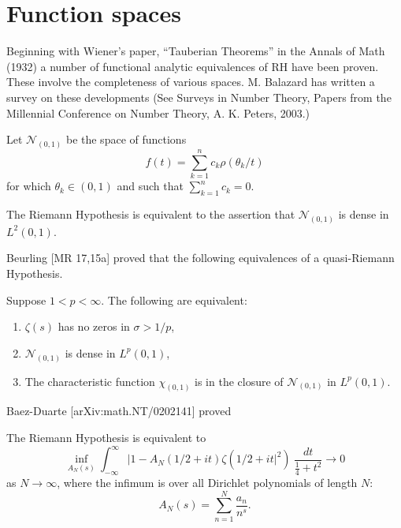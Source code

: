 \documentclass[12pt,letterpaper, reqno]{aimpl}
\begin{document}
\section{Function spaces }

Beginning with Wiener's paper, ``Tauberian Theorems'' in the Annals of
Math (1932) a number of functional analytic equivalences of RH have been
proven. These involve the completeness of various spaces.  M. Balazard has
written a survey on these developments (See Surveys
in Number Theory, Papers from the Millennial Conference on Number Theory,
A. K. Peters, 2003.)

\begin{problemblock}
Let $\mathcal N_{(0,1)} $ be the space of functions
$$
f(t)=\sum_{k=1}^n c_k \rho(\theta_k/t)
$$
for which $\theta_k\in (0,1)$ and such that $\sum_{k=1}^n c_k=0$.

\begin{rhequivalence}[7.1]The Riemann Hypothesis is
equivalent to the assertion that $\mathcal N_{(0,1)} $
is dense in  $L^2(0,1)$.
\end{rhequivalence}

\end{problemblock}

\begin{problemblock} Beurling [MR 17,15a] proved that the following
equivalences of a quasi-Riemann Hypothesis.
\begin{rhequivalence}[7.2] Suppose $1<p<\infty$.  The following
are equivalent:
\begin{enumerate}
\item{} $\zeta(s)$ has no zeros in $\sigma>1/p$,
\item{}   $\mathcal N_{(0,1)} $ is dense in  $L^p(0,1)$,
\item{} The characteristic function $\chi_{(0,1)}$ is in the closure
of $\mathcal N_{(0,1)} $   in  $L^p(0,1)$.
\end{enumerate}
\end{rhequivalence}
\end{problemblock}

\begin{problemblock}
Baez-Duarte [arXiv:math.NT/0202141]
proved
\begin{rhequivalence}[7.3] The Riemann Hypothesis is equivalent to
$$
\inf_{A_N(s)}\int_{-\infty}^\infty |1-A_N(1/2+it)\zeta(1/2+it|^2)~\frac {dt}{\frac 14 +t^2}
\to 0
$$
as $N\to \infty$,  where
the infimum is over all
Dirichlet polynomials of length $N$:
$$
A_N(s)=\sum_{n=1}^N \frac {a_n}{n^s}.
$$
\end{rhequivalence}
\end{problemblock}
\end{document}
